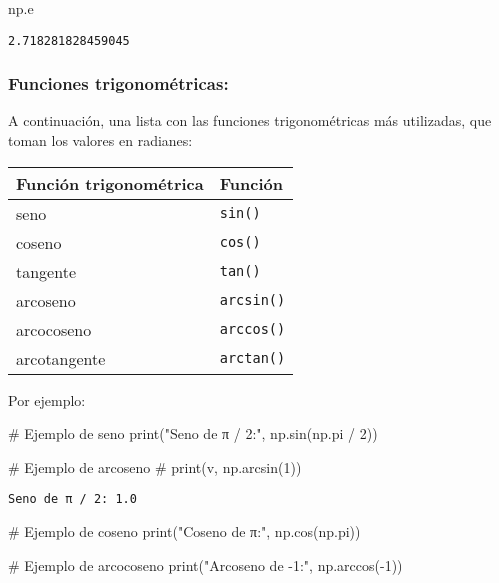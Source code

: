 \documentclass[
  letterpaper,
  DIV=11,
  numbers=noendperiod]{scrreprt}
\newenvironment{Shaded}{\begin{snugshade}}{\end{snugshade}}
\newcommand{\BuiltInTok}[1]{\textcolor[rgb]{0.00,0.23,0.31}{#1}}
\newcommand{\CommentTok}[1]{\textcolor[rgb]{0.37,0.37,0.37}{#1}}
\newcommand{\DecValTok}[1]{\textcolor[rgb]{0.68,0.00,0.00}{#1}}
\newcommand{\NormalTok}[1]{\textcolor[rgb]{0.00,0.23,0.31}{#1}}
\newcommand{\OperatorTok}[1]{\textcolor[rgb]{0.37,0.37,0.37}{#1}}
\newcommand{\StringTok}[1]{\textcolor[rgb]{0.13,0.47,0.30}{#1}}
\begin{document}
\begin{Shaded}
\begin{Highlighting}[]
\NormalTok{np.e}
\end{Highlighting}
\end{Shaded}

\begin{verbatim}
2.718281828459045
\end{verbatim}

\subsubsection{Funciones
trigonométricas:}\label{funciones-trigonomuxe9tricas}

A continuación, una lista con las funciones trigonométricas más
utilizadas, que toman los valores en radianes:

\begin{longtable}[]{@{}ll@{}}
\toprule\noalign{}
Función trigonométrica & Función \\
\midrule\noalign{}
\endhead
\bottomrule\noalign{}
\endlastfoot
seno & \texttt{sin()} \\
coseno & \texttt{cos()} \\
tangente & \texttt{tan()} \\
arcoseno & \texttt{arcsin()} \\
arcocoseno & \texttt{arccos()} \\
arcotangente & \texttt{arctan()} \\
\end{longtable}

Por ejemplo:

\begin{Shaded}
\begin{Highlighting}[]
\CommentTok{\# Ejemplo de seno}
\BuiltInTok{print}\NormalTok{(}\StringTok{"Seno de π / 2:"}\NormalTok{, np.sin(np.pi }\OperatorTok{/} \DecValTok{2}\NormalTok{))}

\CommentTok{\# Ejemplo de arcoseno}
\CommentTok{\# print(v, np.arcsin(1))}
\end{Highlighting}
\end{Shaded}

\begin{verbatim}
Seno de π / 2: 1.0
\end{verbatim}

\begin{Shaded}
\begin{Highlighting}[]
\CommentTok{\# Ejemplo de coseno}
\BuiltInTok{print}\NormalTok{(}\StringTok{"Coseno de π:"}\NormalTok{, np.cos(np.pi))}

\CommentTok{\# Ejemplo de arcocoseno}
\BuiltInTok{print}\NormalTok{(}\StringTok{"Arcoseno de {-}1:"}\NormalTok{, np.arccos(}\OperatorTok{{-}}\DecValTok{1}\NormalTok{))}
\end{Highlighting}
\end{Shaded}
\end{document}
